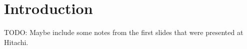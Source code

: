 \section{Introduction}
TODO: Maybe include some notes from the first slides that were presented at Hitachi.